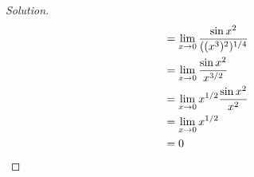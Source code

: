 \begin{enumerate}[(a)]
\begin{proof}[Solution]
\begin{align*}
             & = \displaystyle\lim_{x\to0} \frac{\sin x^2}{((x^3)^2)^{1/4}}       \\
             & = \displaystyle\lim_{x\to0} \frac{\sin x^2}{x^{3/2}}               \\
             & = \displaystyle\lim_{x\to0} x^{1/2}\frac{\sin x^2}{x^2}            \\
             & = \displaystyle\lim_{x\to0} x^{1/2}                                \\
             & = 0 \qedhere                                         \\
          \end{align*}
        \end{proof}
\end{enumerate}

